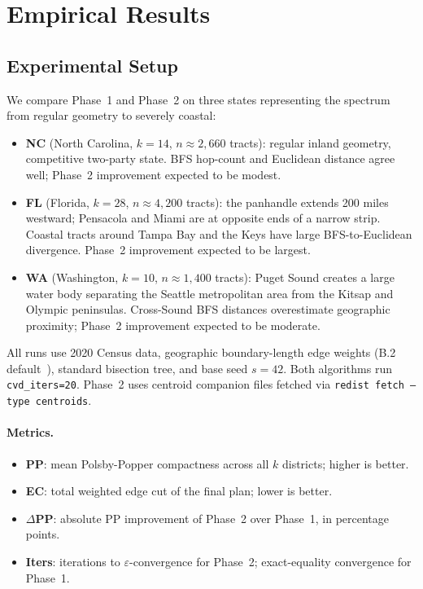 \section{Empirical Results}
\label{sec:results}

\subsection{Experimental Setup}

We compare Phase~1 \cvd{} and Phase~2 \cvdgeo{} on three states representing
the spectrum from regular geometry to severely coastal:

\begin{itemize}
\item \textbf{NC} (North Carolina, $k=14$, $n \approx 2{,}660$ tracts):
  regular inland geometry, competitive two-party state.
  BFS hop-count and Euclidean distance agree well; Phase~2 improvement expected
  to be modest.
\item \textbf{FL} (Florida, $k=28$, $n \approx 4{,}200$ tracts):
  the panhandle extends 200 miles westward; Pensacola and Miami are at
  opposite ends of a narrow strip.
  Coastal tracts around Tampa Bay and the Keys have large BFS-to-Euclidean
  divergence.
  Phase~2 improvement expected to be largest.
\item \textbf{WA} (Washington, $k=10$, $n \approx 1{,}400$ tracts):
  Puget Sound creates a large water body separating the Seattle metropolitan
  area from the Kitsap and Olympic peninsulas.
  Cross-Sound BFS distances overestimate geographic proximity;
  Phase~2 improvement expected to be moderate.
\end{itemize}

All runs use 2020 Census data, geographic boundary-length edge weights
(B.2 default~\citep{b2paper}), standard bisection tree, and base seed $s=42$.
Both algorithms run \texttt{cvd\_iters=20}.
Phase~2 uses centroid companion files fetched via
\texttt{redist fetch --type centroids}.

\paragraph{Metrics.}
\begin{itemize}
\item \textbf{PP}: mean Polsby-Popper compactness across all $k$ districts; higher is better.
\item \textbf{EC}: total weighted edge cut of the final plan; lower is better.
\item \textbf{$\Delta$PP}: absolute PP improvement of Phase~2 over Phase~1, in
  percentage points.
\item \textbf{Iters}: iterations to $\varepsilon$-convergence for Phase~2;
  exact-equality convergence for Phase~1.
\end{itemize}

